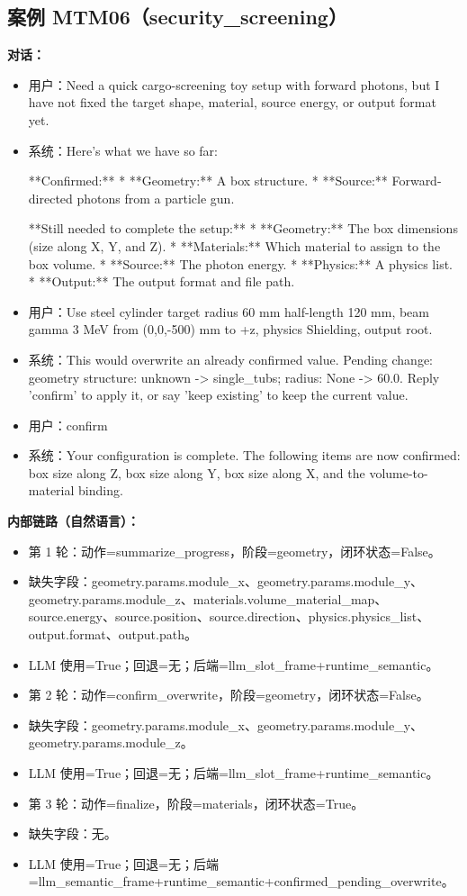\documentclass[11pt]{ctexart}
\begin{document}
\subsection{案例 MTM06（security\_screening）}
\textbf{对话：}
\begin{itemize}
\item 用户：Need a quick cargo-screening toy setup with forward photons, but I have not fixed the target shape, material, source energy, or output format yet.
\item 系统：Here's what we have so far:

**Confirmed:**
*   **Geometry:** A box structure.
*   **Source:** Forward-directed photons from a particle gun.

**Still needed to complete the setup:**
*   **Geometry:** The box dimensions (size along X, Y, and Z).
*   **Materials:** Which material to assign to the box volume.
*   **Source:** The photon energy.
*   **Physics:** A physics list.
*   **Output:** The output format and file path.
\item 用户：Use steel cylinder target radius 60 mm half-length 120 mm, beam gamma 3 MeV from (0,0,-500) mm to +z, physics Shielding, output root.
\item 系统：This would overwrite an already confirmed value. Pending change: geometry structure: unknown -> single\_tubs; radius: None -> 60.0. Reply 'confirm' to apply it, or say 'keep existing' to keep the current value.
\item 用户：confirm
\item 系统：Your configuration is complete. The following items are now confirmed: box size along Z, box size along Y, box size along X, and the volume-to-material binding.
\end{itemize}
\textbf{内部链路（自然语言）：}
\begin{itemize}
\item 第 1 轮：动作=summarize\_progress，阶段=geometry，闭环状态=False。
\item 缺失字段：geometry.params.module\_x、geometry.params.module\_y、geometry.params.module\_z、materials.volume\_material\_map、source.energy、source.position、source.direction、physics.physics\_list、output.format、output.path。
\item LLM 使用=True；回退=无；后端=llm\_slot\_frame+runtime\_semantic。
\item 第 2 轮：动作=confirm\_overwrite，阶段=geometry，闭环状态=False。
\item 缺失字段：geometry.params.module\_x、geometry.params.module\_y、geometry.params.module\_z。
\item LLM 使用=True；回退=无；后端=llm\_slot\_frame+runtime\_semantic。
\item 第 3 轮：动作=finalize，阶段=materials，闭环状态=True。
\item 缺失字段：无。
\item LLM 使用=True；回退=无；后端=llm\_semantic\_frame+runtime\_semantic+confirmed\_pending\_overwrite。
\end{itemize}
\end{document}
